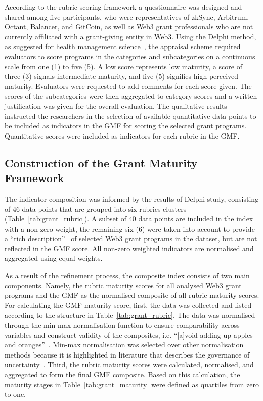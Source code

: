 \documentclass[conference]{IEEEtran}
\begin{document}
According to the rubric scoring framework a questionnaire was designed and shared among five participants, who were representatives of zkSync, Arbitrum, Octant, Balancer, and GitCoin, as well as Web3 grant professionals who are not currently affiliated with a grant-giving entity in Web3. Using the Delphi method, as suggested for health management science~\cite{van_ede_assembling_2024}, the appraisal scheme required evaluators to score programs in the categories and subcategories on a continuous scale from one (1) to five (5). A low score represents low maturity, a score of three (3) signals intermediate maturity, and five (5) signifies high perceived maturity. Evaluators were requested to add comments for each score given. The scores of the subcategories were then aggregated to category scores and a written justification was given for the overall evaluation. The qualitative results instructed the researchers in the selection of available quantitative data points to be included as indicators in the GMF for scoring the selected grant programs. Quantitative scores were included as indicators for each rubric in the GMF.

\subsection{Construction of the Grant Maturity Framework}\label{sec_3.2}

The indicator composition was informed by the results of Delphi study, consisting of 46 data points that are grouped into six rubrics clusters (Table~\ref{tab:grant_rubric}). A subset of 40 data points are included in the index with a non-zero weight, the remaining six (6) were taken into account to provide a ``rich description''~\cite[p.~197]{mcbride_sailing_2019} of selected Web3 grant programs in the dataset, but are not reflected in the GMF score. All non-zero weighted indicators are normalised and aggregated using equal weights.

As a result of the refinement process, the composite index consists of two main components. Namely, the rubric maturity scores for all analysed Web3 grant programs and the GMF as the normalised composite of all rubric maturity scores. For calculating the GMF maturity score, first, the data was collected and listed according to the structure in Table~\ref{tab:grant_rubric}. The data was normalised through the min-max normalisation function to ensure comparability across variables and construct validity of the composites, i.e. “[a]void adding up apples and oranges”~\cite[p.~27]{oecd_handbook_2008}. Min-max normalisation was selected over other normalisation methods because it is highlighted in literature that describes the governance of uncertainty~\cite{winters_when_2004}. Third, the rubric maturity scores were calculated, normalised, and aggregated to form the final GMF composite. Based on this calculation, the maturity stages in Table~\ref{tab:grant_maturity} were defined as quartiles from zero to one.\\
\end{document}
